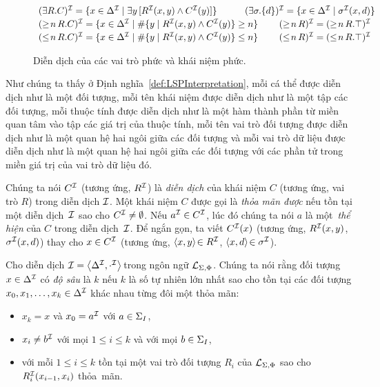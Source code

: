 \begin{figure}
{\[\begin{array}{l}
%
		(\E R.C)^\mI = \{ x \in \Delta^\mI \mid \E y\,[R^\mI(x,y) \wedge C^\mI(y)]\}\qquad\quad (\E \sigma.\{d\})^\mI = \{ x \in \Delta^\mI \mid \sigma^\mI(x,d)\} \\[0.5ex]
%
		(\geq\!n\,R.C)^\mI = \{x \in \Delta^\mI \mid \#\{y \mid R^\mI(x,y) \wedge C^\mI(y)\} \geq n\} \qquad\; (\geq\!n\,R)^\mI = (\geq\!n\,R.\top)^\mI \\[0.5ex]
%
		(\leq\!n\,R.C)^\mI = \{x \in \Delta^\mI \mid \#\{y \mid R^\mI(x,y) \wedge C^\mI(y)\} \leq n \} \qquad\; (\leq\!n\,R)^\mI = (\leq\!n\,R.\top)^\mI
	\end{array}
	\vspace{-2.5ex}
	\]}
\caption{Diễn dịch của các vai trò phức và khái niệm phức.\label{fig:LSPInterpretation}}
\end{figure}

Như chúng ta thấy ở Định nghĩa~\ref{def:LSPInterpretation}, mỗi cá thể được diễn dịch như là một đối tượng, mỗi tên khái niệm được diễn dịch như là một tập các đối tượng, mỗi thuộc tính được diễn dịch như là một hàm thành phần từ miền quan tâm vào tập các giá trị của thuộc tính, mỗi tên vai trò đối tượng được diễn dịch như là một quan hệ hai ngôi giữa các đối tượng và mỗi vai trò dữ liệu được diễn dịch như là một quan hệ hai ngôi giữa các đối tượng với các phần tử trong miền giá trị của vai trò dữ liệu đó.

Chúng ta nói $C^{\mathcal{I}}$ (tương ứng, $R^{\mathcal{I}}$) là {\em diễn dịch} của khái niệm $C$ (tương ứng, vai trò $R$) trong diễn dịch $\mathcal{I}$.
Một khái niệm $C$ được gọi là {\em thỏa mãn được} nếu tồn tại một diễn dịch~$\mathcal{I}$ sao cho $C^{\mathcal{I}} \not= \emptyset$.
Nếu $a^{\mathcal{I}} \in C^{\mathcal{I}}$, lúc đó chúng ta nói $a$ là một~{\em thể hiện} của $C$ trong diễn dịch~$\mathcal{I}$. Để ngắn gọn, ta viết $C^{\mathcal{I}}(x)$ (tương ứng, $R^{\mathcal{I}}(x,y)$, $\sigma^{\mathcal{I}}(x, d)$) thay cho $x \in C^{\mathcal{I}}$ (tương ứng, $\left\langle x, y\right\rangle\! \in R^{\mathcal{I}}$, $\left\langle x, d\right\rangle\! \in \sigma^{\mathcal{I}}$).

Cho diễn dịch $\mathcal{I} = \left\langle\Delta^{\mathcal{I}}, \cdot^{\mathcal{I}}\right\rangle\!$ trong ngôn ngữ $\mathcal{L}_{\Sigma,\Phi}$. Chúng ta nói rằng đối tượng $x \in \Delta^{\mathcal{I}}$ có {\em độ sâu} là $k$ nếu $k$ là số tự nhiên lớn nhất sao cho tồn tại các đối tượng $x_0, x_1, \ldots, x_k \in \Delta^{\mathcal{I}}$ khác nhau từng đôi một thỏa mãn:
\begin{itemize}
	\item $x_k = x$ và $x_0 = a^{\mathcal{I}}$ với $a \in \Sigma_I$,
	\item $x_i \not= b^{\mathcal{I}}$ với mọi $1 \leq i \leq k$ và với mọi $b \in \Sigma_I$,
	\item với mỗi $1 \leq i \leq k$ tồn tại một vai trò đối tượng $R_i$ của $\mathcal{L}_{\Sigma,\Phi}$ sao cho $R_i^{\mathcal{I}}(x_{i-1}, x_i)$ thỏa~mãn.
\end{itemize}

